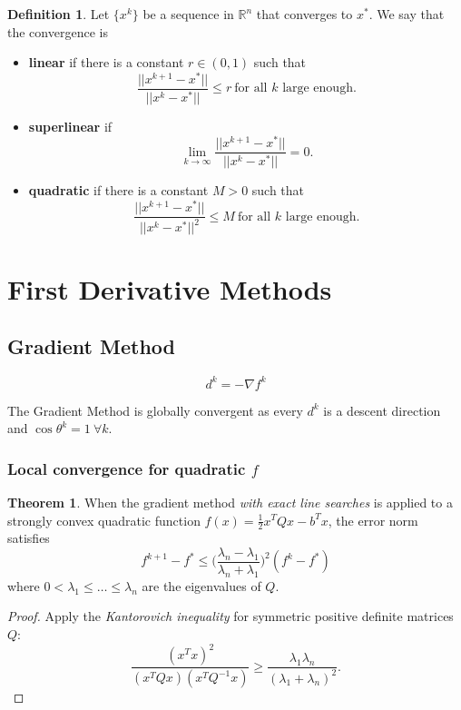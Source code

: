 \documentclass[a4paper, 10pt, twocolumn]{article}
\theoremstyle{definition}
\newtheorem*{defn}{Definition}
\newtheorem{theorem}{Theorem}
\theoremstyle{remark}
\newcommand{\R}{\mathbb{R}}
\begin{document}
\begin{defn}
Let $\{x^k\}$ be a sequence in $\R^n$ that converges to $x^*$. We say that the convergence is
\begin{itemize}
\item \textbf{linear} if there is a constant $r \in (0,1)$ such that
\vspace{5pt}
$$
\frac{||x^{k+1}-x^*||}{||x^k-x^*||} \leq r \ \text{for all $k$ large enough}.
$$
\item \textbf{superlinear} if
\vspace{5pt}
$$
\lim_{k \rightarrow \infty}\frac{||x^{k+1}-x^*||}{||x^k-x^*||} = 0.
$$
\item \textbf{quadratic} if there is a constant $M>0$ such that
\vspace{5pt}
$$
\frac{||x^{k+1}-x^*||}{||x^k-x^*||^2} \leq M \ \text{for all $k$ large enough}.
$$
\end{itemize}
\end{defn}



\section{First Derivative Methods}


\subsection{Gradient Method}

$$
\boxed{d^k = -\nabla f^k}
$$

The Gradient Method is globally convergent as every $d^k$ is a descent direction and $\cos\theta^k = 1 \ \forall k$.

\subsubsection*{Local convergence for quadratic $f$}


\begin{theorem}
When the gradient method \textit{with exact line searches} is applied to a strongly convex quadratic function $f(x) = \frac{1}{2}x^TQx-b^Tx$, the error norm satisfies
$$
f^{k+1}-f^* \leq \bigg(\frac{\lambda_n-\lambda_1}{\lambda_n+\lambda_1}\bigg)^2(f^k-f^*)
$$
where $0 < \lambda_1 \leq \dots \leq \lambda_n$ are the eigenvalues of $Q$.
\begin{proof}
Apply the \textit{Kantorovich inequality} for symmetric positive definite matrices $Q$:
$$
\frac{(x^Tx)^2}{(x^TQx)(x^TQ^{-1}x)} \geq \frac{\lambda_1\lambda_n}{(\lambda_1+\lambda_n)^2}.
$$
\end{proof}
\end{theorem}
\end{document}
